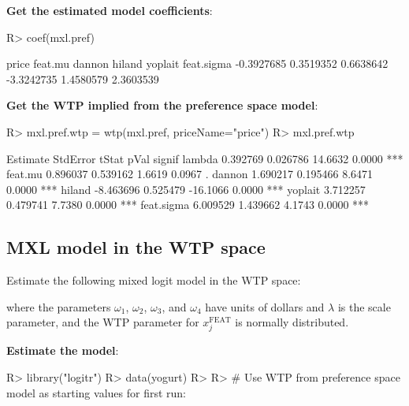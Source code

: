 \documentclass[article]{jss}
\begin{document}
\textbf{Get the estimated model coefficients}:

\begin{CodeChunk}

\begin{CodeInput}
R> coef(mxl.pref)
\end{CodeInput}

\begin{CodeOutput}
     price    feat.mu     dannon     hiland    yoplait feat.sigma 
-0.3927685  0.3519352  0.6638642 -3.3242735  1.4580579  2.3603539 
\end{CodeOutput}
\end{CodeChunk}

\textbf{Get the WTP implied from the preference space model}:

\begin{CodeChunk}

\begin{CodeInput}
R> mxl.pref.wtp = wtp(mxl.pref, priceName="price")
R> mxl.pref.wtp
\end{CodeInput}

\begin{CodeOutput}
            Estimate StdError    tStat   pVal signif
lambda      0.392769 0.026786  14.6632 0.0000    ***
feat.mu     0.896037 0.539162   1.6619 0.0967      .
dannon      1.690217 0.195466   8.6471 0.0000    ***
hiland     -8.463696 0.525479 -16.1066 0.0000    ***
yoplait     3.712257 0.479741   7.7380 0.0000    ***
feat.sigma  6.009529 1.439662   4.1743 0.0000    ***
\end{CodeOutput}
\end{CodeChunk}

\newpage

\hypertarget{mxl-model-in-the-wtp-space}{%
\subsection{MXL model in the WTP
space}\label{mxl-model-in-the-wtp-space}}

Estimate the following mixed logit model in the WTP space:



where the parameters \(\omega_1\), \(\omega_2\), \(\omega_3\), and
\(\omega_4\) have units of dollars and \(\lambda\) is the scale
parameter, and the WTP parameter for \(x_{j}^{\mathrm{FEAT}}\) is
normally distributed.

\textbf{Estimate the model}:

\begin{CodeChunk}

\begin{CodeInput}
R> library("logitr")
R> data(yogurt)
R> 
R> # Use WTP from preference space model as starting values for first run:
\end{CodeInput}
\end{CodeChunk}
\end{document}
